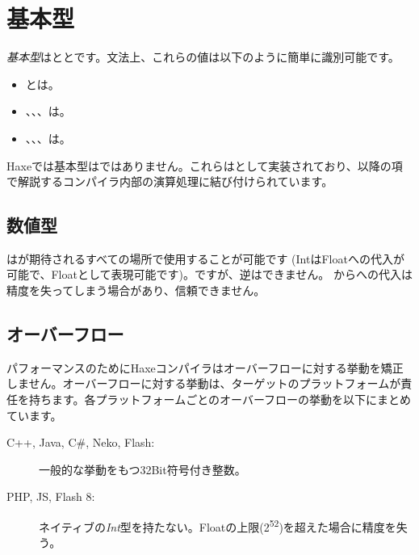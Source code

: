 
\section{基本型}
\label{types-basic-types}

\emph{基本型}はととです。文法上、これらの値は以下のように簡単に識別可能です。

\begin{itemize}
	\item {}とは。
	\item {}、、、は。
	\item {}、、、は。
\end{itemize}

Haxeでは基本型はではありません。これらはとして実装されており、以降の項で解説するコンパイラ内部の演算処理に結び付けられています。

\subsection{数値型}
\label{types-numeric-types}



はが期待されるすべての場所で使用することが可能です (IntはFloatへの代入が可能で、Floatとして表現可能です)。ですが、逆はできません。 からへの代入は精度を失ってしまう場合があり、信頼できません。

\subsection{オーバーフロー}
\label{types-overflow}

パフォーマンスのためにHaxeコンパイラはオーバーフローに対する挙動を矯正しません。オーバーフローに対する挙動は、ターゲットのプラットフォームが責任を持ちます。各プラットフォームごとのオーバーフローの挙動を以下にまとめています。

\begin{description}
	\item[C++, Java, C\#, Neko, Flash:] 一般的な挙動をもつ32Bit符号付き整数。
	\item[PHP, JS, Flash 8:] ネイティブの\emph{Int}型を持たない。Floatの上限(2\textsuperscript{52})を超えた場合に精度を失う。
\end{description}

